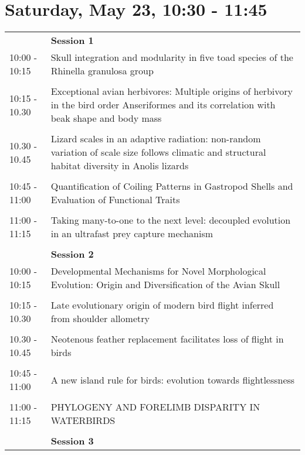 \documentclass{article}
\begin{document}
\section{Saturday, May 23, 10:30 - 11:45}
\begin{longtabu} to \textwidth {lX}
 & \textbf{Session 1} \\ 

10:00 - 10:15 & Skull integration and modularity in five toad species of the Rhinella granulosa group \\ 
 &  \\ 
10:15 - 10.30 & Exceptional avian herbivores: Multiple origins of herbivory in the bird order Anseriformes and its correlation with beak shape and body mass \\ 
 &  \\ 
10.30 - 10.45 & Lizard scales in an adaptive radiation: non-random variation of scale size follows climatic and structural habitat diversity in Anolis lizards \\ 
 &  \\ 
10:45 - 11:00 & Quantification of Coiling Patterns in Gastropod Shells and Evaluation of Functional Traits \\ 
 &  \\ 
11:00 - 11:15 & Taking many-to-one to the next level: decoupled evolution in an ultrafast prey capture mechanism \\ 
 &  \\ 
 & \textbf{Session 2} \\ 

10:00 - 10:15 & Developmental Mechanisms for Novel Morphological Evolution: Origin and Diversification of the Avian Skull \\ 
 &  \\ 
10:15 - 10.30 & Late evolutionary origin of modern bird flight inferred from shoulder allometry \\ 
 &  \\ 
10.30 - 10.45 & Neotenous feather replacement facilitates loss of flight in birds \\ 
 &  \\ 
10:45 - 11:00 & A new island rule for birds: evolution towards flightlessness \\ 
 &  \\ 
11:00 - 11:15 & PHYLOGENY AND FORELIMB DISPARITY IN WATERBIRDS \\ 
 &  \\ 
 & \textbf{Session 3} \\ 


\end{longtabu}
\end{document}
